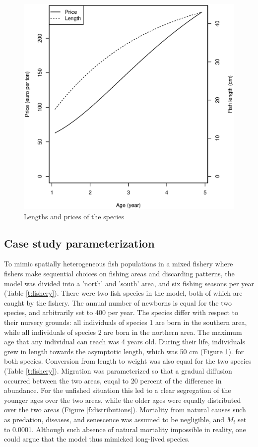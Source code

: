 \documentclass[12pt,oneline,a4paper,numbib]{ouparticle}
\numberwithin{equation}{subsection} %
\begin{document}
\begin{figure}[!ht]
\centering
\label{f:prices}
\includegraphics[width=.69\textwidth]{Figures/prices.eps} 
\caption{Lengths and prices of the species}
\end{figure}


\subsection{Case study parameterization}

To mimic spatially heterogeneous fish populations in a mixed fishery where fishers make sequential choices on fishing areas and discarding patterns, the model was divided into a 'north' and 'south' area, and six fishing seasons per year (Table \ref{t:fishery}). There were two fish species in the model, both of which are caught by the fishery. The annual number of newborns is equal for the two species, and arbitrarily set to 400 per year. The species differ with respect to their nursery grounds: all individuals of species 1 are born in the southern area, while all individuals of species 2 are born in the northern area. The maximum age that any individual can reach was 4 years old. During their life, individuals grew in length towards the asymptotic length, which was 50 cm (Figure \ref{f:prices}). for both species. Conversion from length to weight was also equal for the two species (Table \ref{t:fishery}). Migration was parameterized so that a gradual diffusion occurred between the two areas, euqal to 20 percent of the difference in abundance. For the unfished situation this led to a clear segregation of the younger ages over the two areas, while the older ages were equally distributed over the two areas  (Figure \ref{f:distributions}). Mortality from natural causes such as predation, diseases, and senescence was assumed to be negligible, and $M_i$ set to 0.0001. Although such absence of natural mortality impossible in reality, one could argue that the model thus mimicked long-lived species.
  
\end{document}
